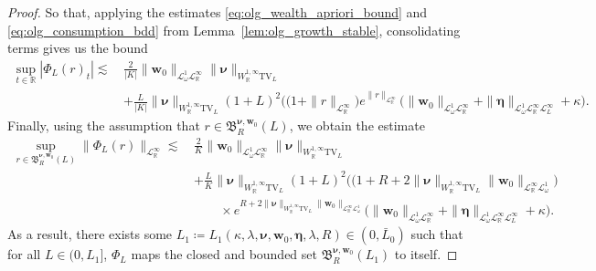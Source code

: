 \documentclass[10pt,a4paper]{amsart}
\theoremstyle{plain}
\theoremstyle{plain}
\theoremstyle{definition}
\theoremstyle{remark}
\newcommand{\TV}{\text{TV}}
\newcommand{\bmeta}{\boldsymbol{\eta}}
\newcommand{\bnu}{\boldsymbol{\nu}}
\newcommand{\bw}{\mathbf{w}}
\newcommand{\fB}{\mathfrak{B}}
\newcommand{\mbR}{\mathbb{R}}
\newcommand{\mfB}{\mathfrak{B}}
\newcommand{\msL}{\mathscr{L}}
\begin{document}
\begin{proof}
So that, applying the estimates \eqref{eq:olg_wealth_apriori_bound} and \eqref{eq:olg_consumption_bdd} from Lemma~\ref{lem:olg_growth_stable}, consolidating terms gives us the bound
%
\begin{equation*}
	\begin{aligned}
		\sup_{t\in \mbR}|\Phi_L(r)_t| \lesssim \, & \frac{2}{|K|}\|\bw_0\|_{\msL^1_\omega \msL^\infty_\mbR}\|\bnu\|_{W^{1,\infty}_{\mbR}\TV_L} \\
		& + \frac{L}{|K|} \|\bnu\|_{W^{1,\infty}_{\mbR}\TV_L}  (1+L)^2\Big( \big(1+\|r\|_{\msL^\infty_\mbR}\big) e^{\|r\|_{\msL^\infty_{\mbR}}} \big(\|\bw_0\|_{\msL^1_\omega \msL^\infty_\mbR } +    \|\bmeta\|_{ \msL^1_\omega \msL^\infty_{\mbR} \msL^\infty_{L}} + \kappa \Big).
	\end{aligned}
\end{equation*}
%
Finally, using the assumption that $r\in \mfB^{\bnu,\bw_0}_R(L)$, we obtain the estimate
%
\begin{equation*}
	\begin{aligned}
		\sup_{r\in \mfB^{\bnu,\bw_0}_R(L) }\|\Phi_L(r)\|_{\msL^\infty_{\mbR}} \lesssim \, & \frac{2}{K}\|\bw_0\|_{\msL^1_\omega \msL^\infty_\mbR}\|\bnu\|_{W^{1,\infty}_{\mbR}\TV_L} \\
		& + \frac{L}{K} \|\bnu\|_{W^{1,\infty}_{\mbR}\TV_L}  (1+L)^2\Big( \big(1+R+2\|\bnu\|_{W^{1,\infty}_{\mbR}\TV_L} \|\bw_0\|_{\msL^\infty_\mbR \msL^1_\omega} \big) \\
        &\qquad \times e^{R+2\|\bnu\|_{W^{1,\infty}_{\mbR}\TV_L} \|\bw_0\|_{\msL^\infty_\mbR \msL^1_\omega} } \big(\|\bw_0\|_{\msL^1_\omega \msL^\infty_\mbR } +    \|\bmeta\|_{ \msL^1_\omega \msL^\infty_{\mbR} \msL^\infty_{L}} + \kappa \Big).
	\end{aligned}
\end{equation*}
%
 As a result, there exists some $L_1\coloneqq L_1(\kappa,\lambda,\bnu, \bw_0,\bmeta,\lambda,R) \in (0,\bar{L}_0)$ such that for all $L \in (0,L_1]$, $\Phi_L$  maps the closed and bounded set $ \fB^{\bnu,\bw_0}_R(L_1)$ to itself.


\end{proof}
\end{document}
